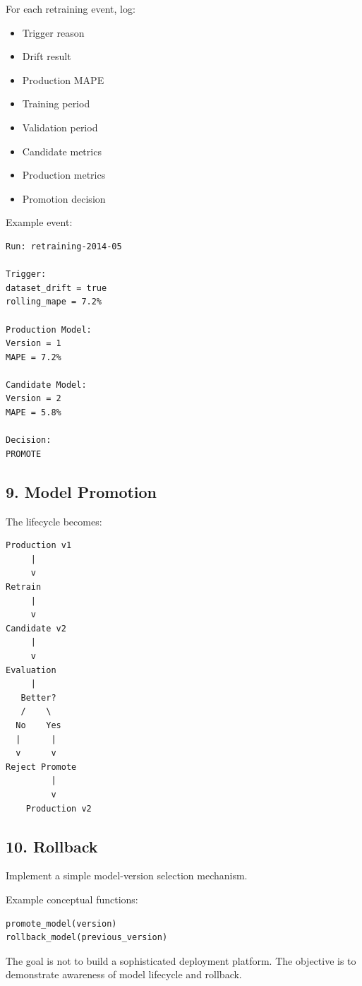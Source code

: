 \documentclass[11pt,a4paper]{article}
\begin{document}
For each retraining event, log:

\begin{itemize}
    \item Trigger reason
    \item Drift result
    \item Production MAPE
    \item Training period
    \item Validation period
    \item Candidate metrics
    \item Production metrics
    \item Promotion decision
\end{itemize}

Example event:

\begin{lstlisting}
Run: retraining-2014-05

Trigger:
dataset_drift = true
rolling_mape = 7.2%

Production Model:
Version = 1
MAPE = 7.2%

Candidate Model:
Version = 2
MAPE = 5.8%

Decision:
PROMOTE
\end{lstlisting}

\subsection{9. Model Promotion}

The lifecycle becomes:

\begin{verbatim}
Production v1
     |
     v
Retrain
     |
     v
Candidate v2
     |
     v
Evaluation
     |
   Better?
   /    \
  No    Yes
  |      |
  v      v
Reject Promote
         |
         v
    Production v2
\end{verbatim}

\subsection{10. Rollback}

Implement a simple model-version selection mechanism.

Example conceptual functions:

\begin{lstlisting}[language=Python]
promote_model(version)
rollback_model(previous_version)
\end{lstlisting}

The goal is not to build a sophisticated deployment platform. The objective is to demonstrate awareness of model lifecycle and rollback.
\end{document}
